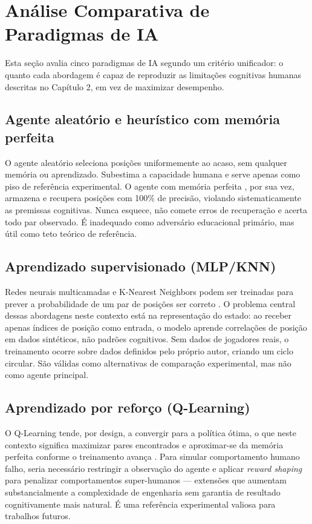 \documentclass[
    12pt,
    openright,
    twoside,
    a4paper,
    english,
    brazil
]{abntex2}
\begin{document}
\chapter{Análise Comparativa de Paradigmas de IA}

Esta seção avalia cinco paradigmas de IA segundo um critério unificador: o quanto cada abordagem é capaz de reproduzir as limitações cognitivas humanas descritas no Capítulo 2, em vez de maximizar desempenho.

\section{Agente aleatório e heurístico com memória perfeita}

O agente aleatório seleciona posições uniformemente ao acaso, sem qualquer memória ou aprendizado. Subestima a capacidade humana e serve apenas como piso de referência experimental. O agente com memória perfeita \cite{zwick1993}, por sua vez, armazena e recupera posições com 100\% de precisão, violando sistematicamente as premissas cognitivas. Nunca esquece, não comete erros de recuperação e acerta todo par observado. É inadequado como adversário educacional primário, mas útil como teto teórico de referência.

\section{Aprendizado supervisionado (MLP/KNN)}

Redes neurais multicamadas e K-Nearest Neighbors podem ser treinadas para prever a probabilidade de um par de posições ser correto \cite{haykin2001,russell2021,malla2025}. O problema central dessas abordagens neste contexto está na representação do estado: ao receber apenas índices de posição como entrada, o modelo aprende correlações de posição em dados sintéticos, não padrões cognitivos. Sem dados de jogadores reais, o treinamento ocorre sobre dados definidos pelo próprio autor, criando um ciclo circular. São válidas como alternativas de comparação experimental, mas não como agente principal.

\section{Aprendizado por reforço (Q-Learning)}

O Q-Learning \cite{sutton2018} tende, por design, a convergir para a política ótima, o que neste contexto significa maximizar pares encontrados e aproximar-se da memória perfeita conforme o treinamento avança \cite{malla2025,kovarik2024}. Para simular comportamento humano falho, seria necessário restringir a observação do agente e aplicar \textit{reward shaping} para penalizar comportamentos super-humanos — extensões que aumentam substancialmente a complexidade de engenharia sem garantia de resultado cognitivamente mais natural. É uma referência experimental valiosa para trabalhos futuros.
\end{document}
